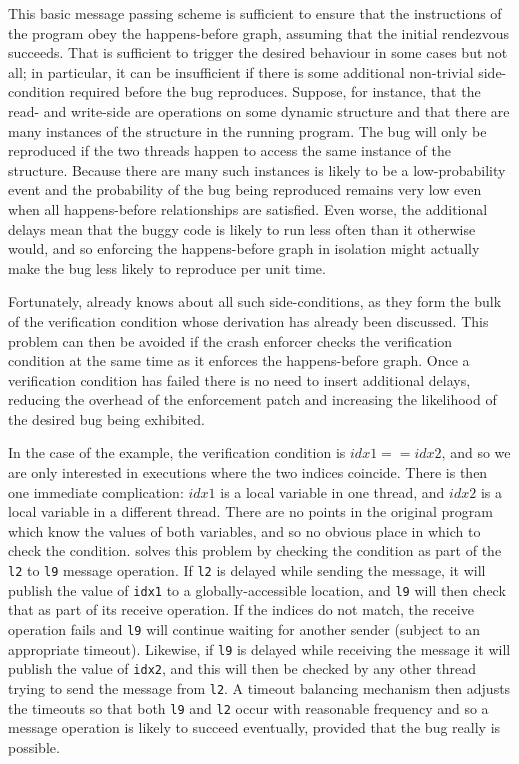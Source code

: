 This basic message passing scheme is sufficient to ensure that the
instructions of the program obey the happens-before graph, assuming
that the initial rendezvous succeeds.  That is sufficient to trigger
the desired behaviour in some cases but not all; in particular, it can
be insufficient if there is some additional non-trivial side-condition
required before the bug reproduces.  Suppose, for instance, that the
read- and write-side {\StateMachines} are operations on some dynamic
structure and that there are many instances of the structure in the
running program.  The bug will only be reproduced if the two threads
happen to access the same instance of the structure.  Because there
are many such instances is likely to be a low-probability event and
the probability of the bug being reproduced remains very low even when
all happens-before relationships are satisfied.  Even worse, the
additional delays mean that the buggy code is likely to run less often
than it otherwise would, and so enforcing the happens-before graph in
isolation might actually make the bug less likely to reproduce per
unit time.

Fortunately, {\technique} already knows about all such
side-conditions, as they form the bulk of the verification condition
whose derivation has already been discussed.  This problem can then be
avoided if the crash enforcer checks the verification condition at the
same time as it enforces the happens-before graph.  Once a
verification condition has failed there is no need to insert
additional delays, reducing the overhead of the enforcement patch and
increasing the likelihood of the desired bug being exhibited.

In the case of the example, the verification condition is $idx1 ==
idx2$, and so we are only interested in executions where the two
indices coincide.  There is then one immediate complication: $idx1$ is
a local variable in one thread, and $idx2$ is a local variable in a
different thread.  There are no points in the original program which
know the values of both variables, and so no obvious place in which to
check the condition.  {\Technique} solves this problem by checking the
condition as part of the \verb|l2| to \verb|l9| message operation.  If
\verb|l2| is delayed while sending the message, it will publish the
value of \verb|idx1| to a globally-accessible location, and \verb|l9|
will then check that as part of its receive operation.  If the indices
do not match, the receive operation fails and \verb|l9| will continue
waiting for another sender (subject to an appropriate timeout).
Likewise, if \verb|l9| is delayed while receiving the message it will
publish the value of \verb|idx2|, and this will then be checked by any
other thread trying to send the message from \verb|l2|.  A timeout
balancing mechanism then adjusts the timeouts so that both \verb|l9|
and \verb|l2| occur with reasonable frequency and so a message
operation is likely to succeed eventually, provided that the bug
really is possible.


